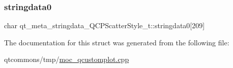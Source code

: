 \subsubsection{\texorpdfstring{stringdata0}{stringdata0}}
{\footnotesize\ttfamily char qt\+\_\+meta\+\_\+stringdata\+\_\+\+Q\+C\+P\+Scatter\+Style\+\_\+t\+::stringdata0\mbox{[}209\mbox{]}}



The documentation for this struct was generated from the following file\+:\begin{DoxyCompactItemize}
\item 
qtcommons/tmp/\mbox{\hyperlink{moc__qcustomplot_8cpp}{moc\+\_\+qcustomplot.\+cpp}}\end{DoxyCompactItemize}
